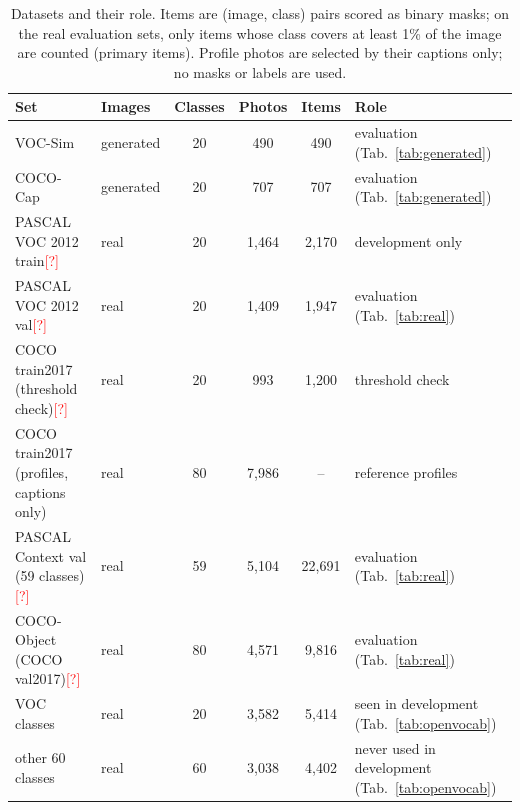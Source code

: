 \documentclass[runningheads]{llncs}
\newcommand{\citeneeded}{\textcolor{red}{[?]}} %
\begin{document}
\begin{table}[t]
\centering
\caption{Datasets and their role. Items are (image, class) pairs scored as binary masks; on the real evaluation sets, only items whose class covers at least 1\% of the image are counted (primary items). Profile photos are selected by their captions only; no masks or labels are used.}
\label{tab:sets}
\footnotesize\setlength{\tabcolsep}{4pt}
\begin{tabular}{@{}llcccl@{}}
\toprule
Set & Images & Classes & Photos & Items & Role \\
\midrule
VOC-Sim~\cite{marcosmanchon2024ovam}  & generated & 20 & 490 & 490 & evaluation (Tab.~\ref{tab:generated}) \\
COCO-Cap~\cite{marcosmanchon2024ovam} & generated & 20 & 707 & 707 & evaluation (Tab.~\ref{tab:generated}) \\
PASCAL VOC 2012 train\citeneeded      & real      & 20 & 1,464 & 2,170 & development only \\
PASCAL VOC 2012 val\citeneeded        & real      & 20 & 1,409 & 1,947 & evaluation (Tab.~\ref{tab:real}) \\
COCO train2017 (threshold check)\citeneeded & real & 20 & 993 & 1,200 & threshold check \\
COCO train2017 (profiles, captions only) & real   & 80 & 7,986 & -- & reference profiles \\
PASCAL Context val (59 classes)\citeneeded & real & 59 & 5,104 & 22,691 & evaluation (Tab.~\ref{tab:real}) \\
COCO-Object (COCO val2017)\citeneeded & real & 80 & 4,571 & 9,816 & evaluation (Tab.~\ref{tab:real}) \\
\quad 20 VOC classes                  & real      & 20 & 3,582 & 5,414 & seen in development (Tab.~\ref{tab:openvocab}) \\
\quad other 60 classes                & real      & 60 & 3,038 & 4,402 & never used in development (Tab.~\ref{tab:openvocab}) \\
\bottomrule
\end{tabular}
\end{table}
\end{document}
